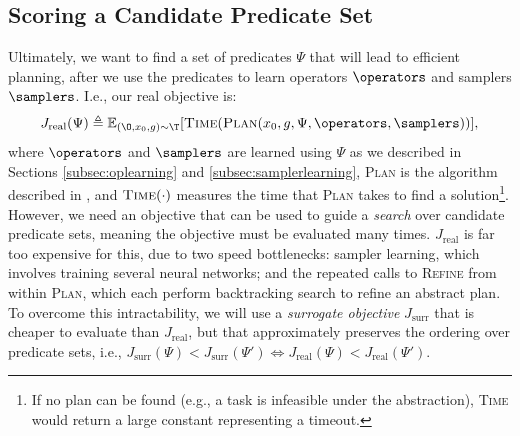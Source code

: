 \subsection{Scoring a Candidate Predicate Set}
\label{subsubsec:scorefunc}

Ultimately, we want to find a set of predicates $\Psi$ that will lead to efficient planning, after we use the predicates to learn operators $\operators$ and samplers $\samplers$.
I.e., our real objective is: $$J_{\text{real}}(\Psi) \triangleq \mathbb{E}_{(\O, x_0, g) \sim \T}[\textsc{Time}(\textsc{Plan}(x_0, g, \Psi, \operators, \samplers))],$$
where $\operators$ and $\samplers$ are learned using $\Psi$ as we described in Sections \ref{subsec:oplearning} and \ref{subsec:samplerlearning}, \textsc{Plan} is the algorithm described in , and $\textsc{Time}(\cdot)$ measures the time that \textsc{Plan} takes to find a solution\footnote{If no plan can be found (e.g., a task is infeasible under the abstraction), \textsc{Time} would return a large constant representing a timeout.}.
However, we need an objective that can be used to guide a \emph{search} over candidate predicate sets, meaning the objective must be evaluated many times. 
$J_{\text{real}}$ is far too expensive for this, due to two speed bottlenecks: sampler learning, which involves training several neural networks; and the repeated calls to \textsc{Refine} from within \textsc{Plan}, which each perform backtracking search to refine an abstract plan.
To overcome this intractability, we will use a \emph{surrogate objective} $J_{\text{surr}}$ that is cheaper to evaluate than $J_{\text{real}}$, but that approximately preserves the ordering over predicate sets, i.e., $J_{\text{surr}}(\Psi) < J_{\text{surr}}(\Psi') \iff J_{\text{real}}(\Psi) < J_{\text{real}}(\Psi')$.



